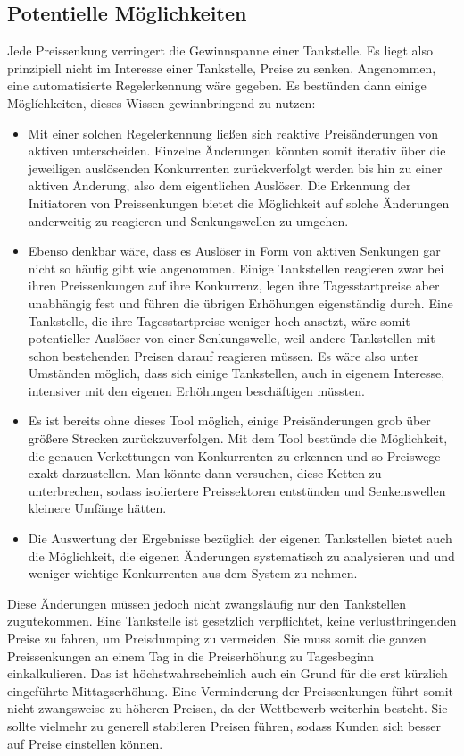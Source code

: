 \subsection{Potentielle Möglichkeiten}
Jede Preissenkung verringert die Gewinnspanne einer Tankstelle. Es liegt also prinzipiell nicht im Interesse einer Tankstelle, Preise zu senken. Angenommen, eine automatisierte Regelerkennung wäre gegeben. Es bestünden dann einige Möglíchkeiten, dieses Wissen gewinnbringend zu nutzen:
\begin{itemize}
\item Mit einer solchen Regelerkennung ließen sich reaktive Preisänderungen von aktiven unterscheiden. Einzelne Änderungen könnten somit iterativ über die jeweiligen auslösenden Konkurrenten zurückverfolgt werden bis hin zu einer aktiven Änderung, also dem eigentlichen Auslöser. Die Erkennung der Initiatoren von Preissenkungen bietet die Möglichkeit auf solche Änderungen anderweitig zu reagieren und Senkungswellen zu umgehen.
\item Ebenso denkbar wäre, dass es Auslöser in Form von aktiven Senkungen gar nicht so häufig gibt wie angenommen. Einige Tankstellen reagieren zwar bei ihren Preissenkungen auf ihre Konkurrenz, legen ihre Tagesstartpreise aber unabhängig fest und führen die übrigen Erhöhungen eigenständig durch. Eine Tankstelle, die ihre Tagesstartpreise weniger hoch ansetzt, wäre somit potentieller Auslöser von einer Senkungswelle, weil andere Tankstellen mit schon bestehenden Preisen darauf reagieren müssen. Es wäre also unter Umständen möglich, dass sich einige Tankstellen, auch in eigenem Interesse, intensiver mit den eigenen Erhöhungen beschäftigen müssten.
\item Es ist bereits ohne dieses Tool möglich, einige Preisänderungen grob über größere Strecken zurückzuverfolgen. Mit dem Tool bestünde die Möglichkeit, die genauen Verkettungen von Konkurrenten zu erkennen und so Preiswege exakt darzustellen. Man könnte dann versuchen, diese Ketten zu unterbrechen, sodass isoliertere Preissektoren entstünden und Senkenswellen kleinere Umfänge hätten.
\item Die Auswertung der Ergebnisse bezüglich der eigenen Tankstellen bietet auch die Möglichkeit, die eigenen Änderungen systematisch zu analysieren und und weniger wichtige Konkurrenten aus dem System zu nehmen.
\end{itemize}
Diese Änderungen müssen jedoch nicht zwangsläufig nur den Tankstellen zugutekommen. Eine Tankstelle ist gesetzlich verpflichtet, keine verlustbringenden Preise zu fahren, um Preisdumping zu vermeiden. Sie muss somit die ganzen Preissenkungen an einem Tag in die Preiserhöhung zu Tagesbeginn einkalkulieren. Das ist höchstwahrscheinlich auch ein Grund für die erst kürzlich eingeführte Mittagserhöhung. Eine Verminderung der Preissenkungen führt somit nicht zwangsweise zu höheren Preisen, da der Wettbewerb weiterhin besteht. Sie sollte vielmehr zu generell stabileren Preisen führen, sodass Kunden sich besser auf Preise einstellen können.